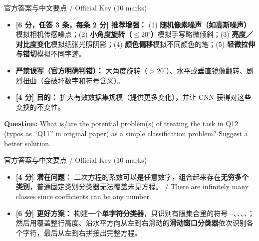 \begin{StudySolution}{官方答案与中文要点 / Official Key (10 marks)}
\begin{itemize}
\item \textbf{[6 分，任答 3 条，每条 2 分] 推荐增强：} (1) \textbf{随机像素噪声（如高斯噪声）}模拟相机传感噪点；(2) \textbf{小角度旋转（$\le 20^\circ$）}模拟手写略微倾斜；(3) \textbf{亮度／对比度变化}模拟纸张光照阴影；(4) \textbf{颜色偏移}模拟不同颜色的笔；(5) \textbf{轻微拉伸与错切}模拟不同字迹。
\item \textbf{严禁误写（官方明确判错）：} 大角度旋转（$>20^\circ$）、水平或垂直镜像翻转、剧烈扭曲（会破坏数字和符号含义）。
\item \textbf{[4 分] 目的：} 扩大有效数据集规模（提供更多变化），并让 CNN 获得对这些变换的不变性。
\end{itemize}
\end{StudySolution}

\textbf{Question:} What is/are the potential problem(s) of treating the task in Q12 (typos as ``Q11'' in original paper) as a simple classification problem? Suggest a better solution.

\begin{StudySolution}{官方答案与中文要点 / Official Key (10 marks)}
\begin{itemize}
\item \textbf{[4 分] 潜在问题：} 二次方程的系数可以是任意数字，组合起来存在\textbf{无穷多个类别}，普通固定类别分类器无法覆盖未见方程。 / There are infinitely many classes since coefficients can be any number.
\item \textbf{[6 分] 更好方案：} 构建一个\textbf{单字符分类器}，只识别有限集合里的符号 –、、、\StudyInline{+}、\StudyInline{-}；然后用覆盖整行高度、沿水平方向从左到右滑动的\textbf{滑动窗口分类器}依次识别各个字符，最后从左到右拼接出完整方程。
\end{itemize}
\end{StudySolution}


